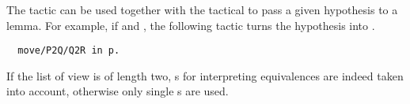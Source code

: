 The tactic  can be used together with the 
tactical to pass a given hypothesis to a lemma. For example, if 
 and , the following
tactic turns the hypothesis  into .
\begin{lstlisting}
  move/P2Q/Q2R in p.
\end{lstlisting}

If the list of view is of length two, s for interpreting
equivalences are indeed taken into account, otherwise only single
s are used.
